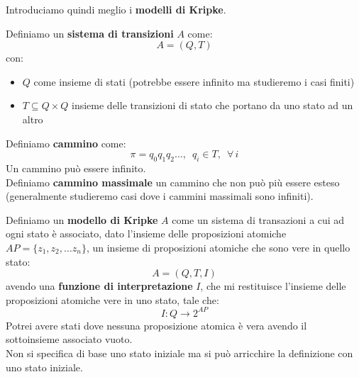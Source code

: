 \documentclass[a4paper,12pt, oneside]{book}
\begin{document}
Introduciamo quindi meglio i \textbf{modelli di Kripke}.\\
\begin{definizione}
  Definiamo un \textbf{sistema di transizioni} $A$ come:
  \[A=(Q,T)\]
  con:
  \begin{itemize}
    \item $Q$ come insieme di stati (potrebbe essere infinito ma studieremo i
    casi finiti)
    \item $T\subseteq Q\times Q$ insieme delle transizioni di stato che portano
    da uno stato ad un altro
  \end{itemize}
\end{definizione}
\begin{definizione}
  Definiamo \textbf{cammino} come:
  \[\pi=q_0q_1q_2\ldots,\,\,\,q_i\in T,\,\,\, \forall\,i\]
  Un cammino può essere infinito.\\
  Definiamo \textbf{cammino massimale} un cammino che non può più essere esteso
  (generalmente studieremo casi dove i cammini massimali sono infiniti).
\end{definizione}
\begin{definizione}
  Definiamo un \textbf{modello di Kripke} $A$ come un sistema di transazioni a
  cui ad ogni stato è associato, dato l'insieme delle proposizioni atomiche
  $AP=\{z_1,z_2,\ldots z_n\}$, un insieme  di
  proposizioni atomiche che sono vere in quello stato:
  \[A=(Q,T,I)\]
  avendo una \textbf{funzione di interpretazione} $I$, che mi restituisce
  l'insieme delle proposizioni atomiche vere in uno stato, tale che:
  \[I:Q\to 2^{AP}\]
  Potrei avere stati dove nessuna proposizione atomica è vera avendo il
  sottoinsieme associato vuoto.\\
  Non si specifica di base uno stato iniziale ma si può arricchire la
  definizione con uno stato iniziale.
\end{definizione}
\end{document}
